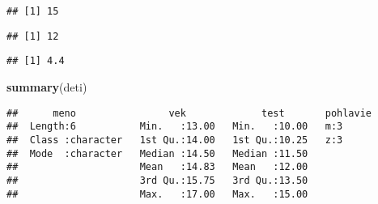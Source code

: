 \documentclass[
]{article}
\newenvironment{Shaded}{\begin{snugshade}}{\end{snugshade}}
\newcommand{\CommentTok}[1]{\textcolor[rgb]{0.56,0.35,0.01}{\textit{#1}}}
\newcommand{\FunctionTok}[1]{\textcolor[rgb]{0.13,0.29,0.53}{\textbf{#1}}}
\newcommand{\NormalTok}[1]{#1}
\newcommand{\SpecialCharTok}[1]{\textcolor[rgb]{0.81,0.36,0.00}{\textbf{#1}}}
\begin{document}
\begin{verbatim}
## [1] 15
\end{verbatim}

\begin{Shaded}
\end{Shaded}

\begin{verbatim}
## [1] 12
\end{verbatim}

\begin{Shaded}
\end{Shaded}

\begin{verbatim}
## [1] 4.4
\end{verbatim}

\begin{Shaded}
\begin{Highlighting}[]
\FunctionTok{summary}\NormalTok{(deti)}
\end{Highlighting}
\end{Shaded}

\begin{verbatim}
##      meno                vek             test       pohlavie
##  Length:6           Min.   :13.00   Min.   :10.00   m:3     
##  Class :character   1st Qu.:14.00   1st Qu.:10.25   z:3     
##  Mode  :character   Median :14.50   Median :11.50           
##                     Mean   :14.83   Mean   :12.00           
##                     3rd Qu.:15.75   3rd Qu.:13.50           
##                     Max.   :17.00   Max.   :15.00
\end{verbatim}
\end{document}
